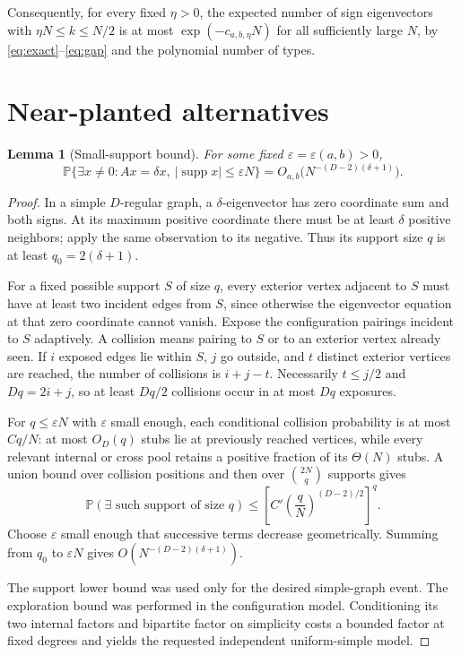 \documentclass[11pt]{article}
\newtheorem{lemma}{Lemma}
\newcommand{\Prob}{\mathbb P}
\newcommand{\supp}{\operatorname{supp}}
\begin{document}
Consequently, for every fixed $\eta>0$, the expected number of sign eigenvectors with $\eta N\le k\le N/2$ is at most $\exp(-c_{a,b,\eta}N)$ for all sufficiently large $N$, by \eqref{eq:exact}--\eqref{eq:gap} and the polynomial number of types.

\section{Near-planted alternatives}
\begin{lemma}[Small-support bound]\label{lem:support}
For some fixed $\varepsilon=\varepsilon(a,b)>0$,
\[
 \Prob\{\exists x\ne0:Ax=\delta x,\ |\supp x|\le\varepsilon N\}
 =O_{a,b}\bigl(N^{-(D-2)(\delta+1)}\bigr).
\]
\end{lemma}
\begin{proof}
In a simple $D$-regular graph, a $\delta$-eigenvector has zero coordinate sum and both signs. At its maximum positive coordinate there must be at least $\delta$ positive neighbors; apply the same observation to its negative. Thus its support size $q$ is at least $q_0=2(\delta+1)$.

For a fixed possible support $S$ of size $q$, every exterior vertex adjacent to $S$ must have at least two incident edges from $S$, since otherwise the eigenvector equation at that zero coordinate cannot vanish. Expose the configuration pairings incident to $S$ adaptively. A collision means pairing to $S$ or to an exterior vertex already seen. If $i$ exposed edges lie within $S$, $j$ go outside, and $t$ distinct exterior vertices are reached, the number of collisions is $i+j-t$. Necessarily $t\le j/2$ and $Dq=2i+j$, so at least $Dq/2$ collisions occur in at most $Dq$ exposures.

For $q\le\varepsilon N$ with $\varepsilon$ small enough, each conditional collision probability is at most $Cq/N$: at most $O_D(q)$ stubs lie at previously reached vertices, while every relevant internal or cross pool retains a positive fraction of its $\Theta(N)$ stubs. A union bound over collision positions and then over $\binom{2N}q$ supports gives
\[
 \Prob(\exists\text{ such support of size }q)
 \le\left[C'\left(\frac qN\right)^{(D-2)/2}\right]^q.
\]
Choose $\varepsilon$ small enough that successive terms decrease geometrically. Summing from $q_0$ to $\varepsilon N$ gives $O(N^{-(D-2)(\delta+1)})$.

The support lower bound was used only for the desired simple-graph event. The exploration bound was performed in the configuration model. Conditioning its two internal factors and bipartite factor on simplicity costs a bounded factor at fixed degrees and yields the requested independent uniform-simple model.
\end{proof}
\end{document}
